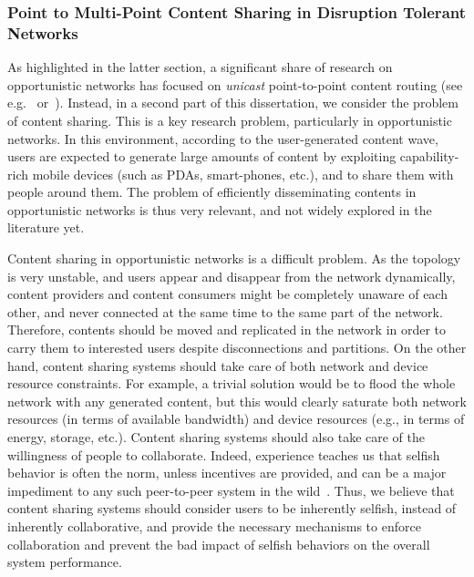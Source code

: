 \subsubsection{Point to Multi-Point Content Sharing in Disruption Tolerant Networks}

As highlighted in the latter section, a significant share of research on opportunistic networks has focused on \emph{unicast} point-to-point content routing (see e.g.~\cite{DTNTaxonomy} or~\cite{Passarella:Survey}). Instead, in a second part of this dissertation, we consider the problem of content sharing. This is a key research problem, 
particularly in opportunistic networks. In this environment, according to the user-generated content wave, users are expected to generate large amounts of content 
by exploiting capability-rich mobile devices (such as PDAs, smart-phones, etc.), and to share them with people around them.  The problem of efficiently disseminating contents in opportunistic networks is thus very relevant, and not widely explored in the literature yet.
 
Content sharing in opportunistic networks is a difficult problem. As the topology is very unstable, and users appear and disappear from the network dynamically, content providers and content consumers might be completely unaware of each other, and never connected at the same 
time to the same part of the network. Therefore, contents should be moved and replicated in the network in order to carry them to interested users despite disconnections 
and partitions. On the other hand, content sharing systems should take care of both network and device resource constraints.
For example, a trivial solution would be to flood the whole network with any generated content, but this would clearly saturate both network resources (in terms of available bandwidth) and device resources (e.g., in terms of energy, storage, etc.). Content sharing systems should also take care of the willingness of people to collaborate. Indeed,  
experience teaches us that selfish behavior is often the norm, unless incentives are provided, and can be a major impediment to any such peer-to-peer system in the wild~\cite{NashEquilibria}. Thus, we believe that content sharing systems should consider users to be inherently selfish, instead of inherently collaborative, and provide the necessary mechanisms to enforce collaboration and prevent the bad impact of selfish behaviors on the overall system performance.  

